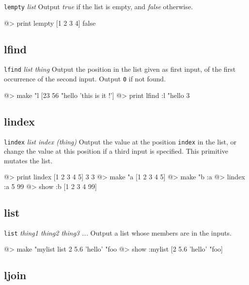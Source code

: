 {\tt lempty} {\it list} 
\newline\newline 
Output {\it true} if the list is empty, and {\it false} otherwise.
\begin{verbatimtab} 
@> print lempty [1 2 3 4]
false
\end{verbatimtab}

\subsection*{lfind}  
 
{\tt lfind} {\it list thing} 
\newline\newline 
Output the position in the list given as first input, of the first occurrence of the second input. Output {\tt 0} if not found.
\begin{verbatimtab} 
@> make "l [23 56 "hello 'this is it !']
@> print lfind :l "hello
3
\end{verbatimtab}

\subsection*{lindex}  
 
{\tt lindex} {\it list index (thing)} 
\newline\newline 
Output the value at the position {\tt index} in the list, or change the value at this position if a third input is specified. This primitive mutates the list.
\begin{verbatimtab} 
@> print lindex [1 2 3 4 5] 3
3
@> make "a [1 2 3 4 5]
@> make "b :a
@> lindex :a 5 99
@> show :b
[1 2 3 4 99]
\end{verbatimtab}

\subsection*{list}  
 
{\tt list} {\it thing1 thing2 thing3 ...} 
\newline\newline 
Output a list whose members are in the inputs.
\begin{verbatimtab} 
@> make "mylist list 2 5.6 'hello' "foo
@> show :mylist
[2 5.6 'hello' "foo]
\end{verbatimtab}

\subsection*{ljoin} 

